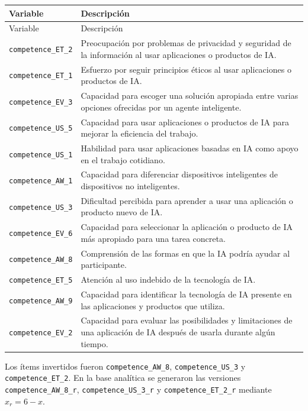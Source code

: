 \documentclass[11pt,a4paper]{article}
\begin{document}
\begin{longtable}{p{}p{}}
\toprule
Variable & Descripción \\
\midrule
\endfirsthead
\toprule
Variable & Descripción \\
\midrule
\endhead
\texttt{competence\_ET\_2} & Preocupación por problemas de privacidad y seguridad de la información al usar aplicaciones o productos de IA. \\
\texttt{competence\_ET\_1} & Esfuerzo por seguir principios éticos al usar aplicaciones o productos de IA. \\
\texttt{competence\_EV\_3} & Capacidad para escoger una solución apropiada entre varias opciones ofrecidas por un agente inteligente. \\
\texttt{competence\_US\_5} & Capacidad para usar aplicaciones o productos de IA para mejorar la eficiencia del trabajo. \\
\texttt{competence\_US\_1} & Habilidad para usar aplicaciones basadas en IA como apoyo en el trabajo cotidiano. \\
\texttt{competence\_AW\_1} & Capacidad para diferenciar dispositivos inteligentes de dispositivos no inteligentes. \\
\texttt{competence\_US\_3} & Dificultad percibida para aprender a usar una aplicación o producto nuevo de IA. \\
\texttt{competence\_EV\_6} & Capacidad para seleccionar la aplicación o producto de IA más apropiado para una tarea concreta. \\
\texttt{competence\_AW\_8} & Comprensión de las formas en que la IA podría ayudar al participante. \\
\texttt{competence\_ET\_5} & Atención al uso indebido de la tecnología de IA. \\
\texttt{competence\_AW\_9} & Capacidad para identificar la tecnología de IA presente en las aplicaciones y productos que utiliza. \\
\texttt{competence\_EV\_2} & Capacidad para evaluar las posibilidades y limitaciones de una aplicación de IA después de usarla durante algún tiempo. \\
\bottomrule
\end{longtable}

Los ítems invertidos fueron \texttt{competence\_AW\_8}, \texttt{competence\_US\_3} y \texttt{competence\_ET\_2}. En la base analítica se generaron las versiones \texttt{competence\_AW\_8\_r}, \texttt{competence\_US\_3\_r} y \texttt{competence\_ET\_2\_r} mediante $x_r=6-x$.
\end{document}
